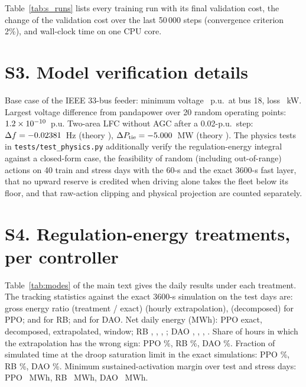 \documentclass[10pt,a4paper]{article}
\begin{document}
Table~\ref{tab:s_runs} lists every training run with its final validation cost, the change of the validation
cost over the last 50\,000 steps (convergence criterion 2\%), and wall-clock time on one CPU core.



\section*{S3. Model verification details}

Base case of the IEEE 33-bus feeder: minimum voltage \ValVmin~p.u.\ at bus 18, loss \ValLoss~kW. Largest
voltage difference from pandapower over 20 random operating points: $1.2\times10^{-10}$~p.u. Two-area LFC without
AGC after a 0.02-p.u.\ step: $\Delta f=-0.02381$~Hz (theory \ValDfTh), $\Delta P_{\mathrm{tie}}=-5.000$~MW
(theory \ValTieTh). The physics tests in \texttt{tests/test\_physics.py} additionally verify the regulation-energy
integral against a closed-form case, the feasibility of random (including out-of-range) actions on 40 train and
stress days with the 60-s and the exact 3600-s fast layer, that no upward reserve is credited when driving alone
takes the fleet below its floor, and that raw-action clipping and physical projection are counted separately.

\section*{S4. Regulation-energy treatments, per controller}

Table~\ref{tab:modes} of the main text gives the daily results under each treatment. The tracking statistics
against the exact 3600-s simulation on the test days are: gross energy ratio (treatment / exact)
\TrkPPOGrossHourRatio{} (hourly extrapolation), \TrkPPOGrossDecRatio{} (decomposed) for PPO;
\TrkRBGrossHourRatio{} and \TrkRBGrossDecRatio{} for RB; \TrkDAOGrossHourRatio{} and \TrkDAOGrossDecRatio{}
for DAO. Net daily energy (MWh): PPO \TrkPPONetFull{} exact, \TrkPPONetDec{} decomposed, \TrkPPONetHour{}
extrapolated, \TrkPPONetWin{} window; RB \TrkRBNetFull, \TrkRBNetDec, \TrkRBNetHour, \TrkRBNetWin;
DAO \TrkDAONetFull, \TrkDAONetDec, \TrkDAONetHour, \TrkDAONetWin. Share of hours in which the extrapolation
has the wrong sign: PPO \TrkPPOSignFlipPct\%, RB \TrkRBSignFlipPct\%, DAO \TrkDAOSignFlipPct\%.
Fraction of simulated time at the droop saturation limit in the exact simulations: PPO \TrkPPOSatFrac\%,
RB \TrkRBSatFrac\%, DAO \TrkDAOSatFrac\%. Minimum sustained-activation margin over test and stress days:
PPO \TrkPPOMarginMin~MWh, RB \TrkRBMarginMin~MWh, DAO \TrkDAOMarginMin~MWh.
\end{document}
